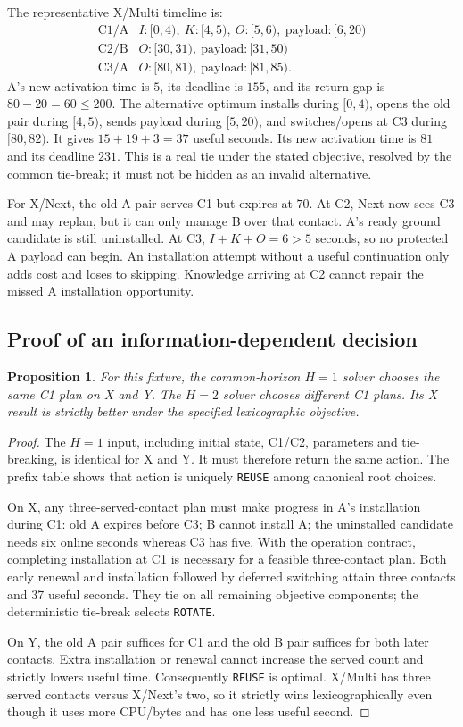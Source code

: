 \documentclass[11pt,a4paper]{article}
\newcommand{\act}[1]{\texttt{#1}}
\newtheorem{proposition}{Proposition}
\begin{document}
The representative X/Multi timeline is:
\[
\begin{array}{c|l}
\mathrm{C1/A}& I:[0,4),\ K:[4,5),\ O:[5,6),\ \mathrm{payload}:[6,20)\\
\mathrm{C2/B}& O:[30,31),\ \mathrm{payload}:[31,50)\\
\mathrm{C3/A}& O:[80,81),\ \mathrm{payload}:[81,85).
\end{array}
\]
A's new activation time is $5$, its deadline is $155$, and its return gap is $80-20=60\leq200$. The alternative optimum installs during $[0,4)$, opens the old pair during $[4,5)$, sends payload during $[5,20)$, and switches/opens at C3 during $[80,82)$. It gives $15+19+3=37$ useful seconds. Its new activation time is $81$ and its deadline $231$. This is a real tie under the stated objective, resolved by the common tie-break; it must not be hidden as an invalid alternative.

For X/Next, the old A pair serves C1 but expires at $70$. At C2, Next now sees C3 and may replan, but it can only manage B over that contact. A's ready ground candidate is still uninstalled. At C3, $I+K+O=6>5$ seconds, so no protected A payload can begin. An installation attempt without a useful continuation only adds cost and loses to skipping. Knowledge arriving at C2 cannot repair the missed A installation opportunity.

\subsection{Proof of an information-dependent decision}
\begin{proposition}
For this fixture, the common-horizon $H=1$ solver chooses the same C1 plan on X and Y. The $H=2$ solver chooses different C1 plans. Its X result is strictly better under the specified lexicographic objective.
\end{proposition}
\begin{proof}
The $H=1$ input, including initial state, C1/C2, parameters and tie-breaking, is identical for X and Y. It must therefore return the same action. The prefix table shows that action is uniquely \act{REUSE} among canonical root choices.

On X, any three-served-contact plan must make progress in A's installation during C1: old A expires before C3; B cannot install A; the uninstalled candidate needs six online seconds whereas C3 has five. With the operation contract, completing installation at C1 is necessary for a feasible three-contact plan. Both early renewal and installation followed by deferred switching attain three contacts and 37 useful seconds. They tie on all remaining objective components; the deterministic tie-break selects \act{ROTATE}.

On Y, the old A pair suffices for C1 and the old B pair suffices for both later contacts. Extra installation or renewal cannot increase the served count and strictly lowers useful time. Consequently \act{REUSE} is optimal. X/Multi has three served contacts versus X/Next's two, so it strictly wins lexicographically even though it uses more CPU/bytes and has one less useful second.
\end{proof}
\end{document}
